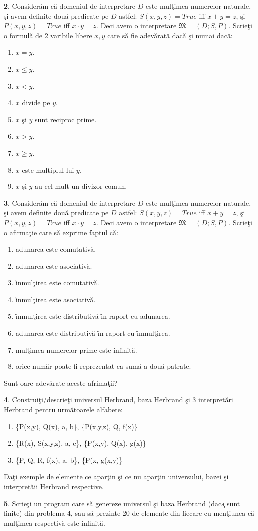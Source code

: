 \documentclass{article}
\begin{document}
{\bf 2}. Consider\u{a}m c\u{a} domeniul de interpretare $D$ este mul\c{t}imea numerelor naturale, \c{s}i avem definite dou\u{a} predicate pe $D$ astfel: 
$S(x,y,z)=True$ iff $x+y=z$, \c{s}i $P(x,y,z)=True$ iff $x\cdot{y}=z$. Deci avem o interpretare $\mathfrak{M}=(D;S,P)$. Scrie\c{t}i o formul\u{a} de 2 varibile libere $x, y$ care s\u{a} fie adev\u{a}rat\u{a} dac\u{a} \c{s}i numai dac\u{a}:
\begin{enumerate}
\item $x=y$.
\item $x\le{y}$.
\item $x<y$.
\item $x$ divide pe $y$.
\item $x$ \c{s}i $y$ sunt reciproc prime.
\item $x>y$.
\item $x\ge{y}$.
\item $x$ este multiplul lui $y$.
\item $x$ \c{s}i $y$ au cel mult un divizor comun.
\end{enumerate}

\bigskip

{\bf 3}. Consider\u{a}m c\u{a} domeniul de interpretare $D$ este mul\c{t}imea numerelor naturale, \c{s}i avem definite dou\u{a} predicate pe $D$ astfel: 
$S(x,y,z)=True$ iff $x+y=z$, \c{s}i $P(x,y,z)=True$ iff $x\cdot{y}=z$. Deci avem o interpretare $\mathfrak{M}=(D;S,P)$. Scrie\c{t}i o afirma\c{t}ie care s\u{a} exprime faptul c\u{a}:
\begin{enumerate}
\item adunarea este comutativ\u{a}.
\item adunarea este asociativ\u{a}.
\item \^{\i}nmul\c{t}irea este comutativ\u{a}.
\item \^{\i}nmul\c{t}irea este asociativ\u{a}.
\item \^{\i}nmul\c{t}irea este distributiv\u{a} \^{\i}n raport cu adunarea.
\item adunarea este distributiv\u{a} \^{\i}n raport cu \^{\i}nmul\c{t}irea.
\item mul\c{t}imea numerelor prime este infinit\u{a}.
\item orice num\u{a}r poate fi reprezentat ca sum\u{a} a dou\u{a} patrate.
\end{enumerate}
Sunt oare adev\u{a}rate aceste afrima\c{t}ii?

\bigskip

{\bf 4}. Construi\c{t}i/descrie\c{t}i universul Herbrand, baza Herbrand \c{s}i 3 interpret\u{a}ri Herbrand pentru urm\u{a}toarele alfabete:
\begin{enumerate}
\item \{P(x,y), Q(x), a, b\}, \{P(x,y,z), Q, f(x)\}
\item \{R(x), S(x,y,z), a, c\}, \{P(x,y), Q(x), g(x)\}
\item \{P, Q, R, f(x), a, b\}, \{P(x, g(x,y)\}
\end{enumerate}
Da\c{t}i exemple de elemente ce apar\c{t}in \c{s}i ce nu apar\c{t}in universului, bazei \c{s}i interpret\u{a}ii Herbrand respective. 

\bigskip

{\bf 5}. Scrie\c{t}i un program care s\u{a} genereze universul \c{s}i baza Herbrand (dac\c{a} sunt finite) din problema 4, sau s\u{a} prezinte 20 de elemente din fiecare cu men\c{t}iunea c\u{a} mul\c{t}imea respectiv\u{a} este infinit\u{a}. 
\end{document}
